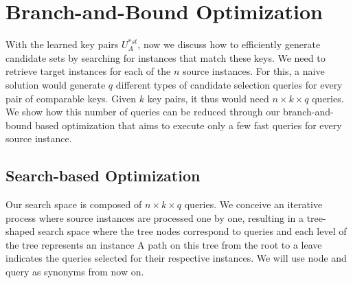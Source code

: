 \section{Branch-and-Bound Optimization}


With the learned key pairs $U^{*st}_A$, now we discuss how to efficiently generate candidate sets by searching for instances that match these keys. We need to retrieve target instances for each of the $n$ source instances. For this, a naive solution would generate $q$ different types of candidate selection queries for every pair of comparable keys. Given $k$ key pairs, it thus would need $n \times k \times q$ queries. We show how this number of queries can be reduced through our branch-and-bound based optimization that aims to execute only a few fast queries for every source instance. 

 
\subsection{Search-based Optimization} 
Our search space is composed of $n \times k \times q$ queries. We conceive an iterative process where source instances are processed one by one, resulting in a tree-shaped search space where the tree nodes correspond to queries and each level of the tree represents an instance  A path on this tree from the root to a leave indicates the queries selected for their respective instances. We will use node and query as synonyms from now on.

